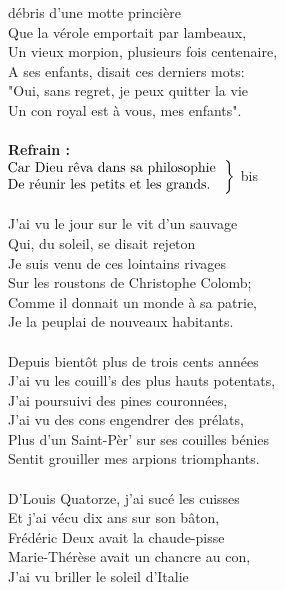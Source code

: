 
 débris d'une motte princière
\\Que la vérole emportait par lambeaux,
\\Un vieux morpion, plusieurs fois centenaire,
\\A ses enfants, disait ces derniers mots:
\\"Oui, sans regret, je peux quitter la vie
\\Un con royal est à vous, mes enfants".
\\\\\textbf{Refrain :}
\\
$\left.\begin{tabular}{l}
\hspace{-0.4cm}
Car Dieu rêva dans sa philosophie
\\
\hspace{-0.4cm}
De réunir les petits et les grands.
\end{tabular}\right\rbrace$ bis
\\\\J'ai vu le jour sur le vit d'un sauvage
\\Qui, du soleil, se disait rejeton
\\Je suis venu de ces lointains rivages
\\Sur les roustons de Christophe Colomb;
\\Comme il donnait un monde à sa patrie,
\\Je la peuplai de nouveaux habitants.
\\\\Depuis bientôt plus de trois cents années
\\J'ai vu les couill's des plus hauts potentats,
\\J'ai poursuivi des pines couronnées,
\\J'ai vu des cons engendrer des prélats,
\\Plus d'un Saint-Pèr' sur ses couilles bénies
\\Sentit grouiller mes arpions triomphants.
\\\\D'Louis Quatorze, j'ai sucé les cuisses
\\Et j'ai vécu dix ans sur son bâton,
\\Frédéric Deux avait la chaude-pisse
\\Marie-Thérèse avait un chancre au con,
\\J'ai vu briller le soleil d'Italie
